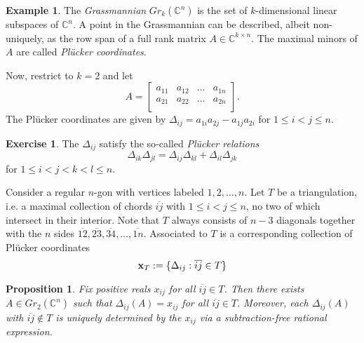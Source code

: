 \documentclass{amsart}
\newtheorem{proposition}[theorem]{Proposition}
\theoremstyle{definition}
\newtheorem{example}[theorem]{Example}
\newtheorem{subexercise}{Exercise}[theorem]
\theoremstyle{remark}
\numberwithin{equation}{section}
\newcommand{\x}{{\bf x}}
\newcommand{\CC}{{\mathbb{C}}}
\begin{document}
  \begin{example} \label{example:Gr2n}
		The \emph{Grassmannian} $Gr_{k}(\CC^n)$ is the set of $k$-dimensional linear subspaces of $\CC^n$.  A point in the Grassmannian can be described, albeit non-uniquely, as the row span of a full rank matrix $A \in \CC^{k \times n}$.  The maximal minors of $A$ are called \emph{Pl\"ucker coordinates}.
		
		Now, restrict to $k=2$ and let 
		\begin{displaymath}
			A = \left[ \begin{array}{cccc}
			a_{11} & a_{12} & \ldots & a_{1n} \\
			a_{21} & a_{22} & \ldots & a_{2n} \\
			\end{array} \right].
		\end{displaymath}
		The Pl\"ucker coordinates are given by $\Delta_{ij} = a_{1i}a_{2j} - a_{1j}a_{2i}$ for $1 \leq i < j \leq n$.  
		
		\begin{subexercise}
			The $\Delta_{ij}$ satisfy the so-called \emph{Pl\"ucker relations}
			\begin{displaymath}
				\Delta_{ik}\Delta_{jl} = \Delta_{ij}\Delta_{kl} + \Delta_{il}\Delta_{jk}
			\end{displaymath}
			for $1 \leq i < j < k < l \leq n$.
		\end{subexercise}
		
		Consider a regular $n$-gon with vertices labeled $1,2,\ldots, n$.  Let $T$ be a triangulation, i.e. a maximal collection of chords $\overline{ij}$ with $1 \leq i < j \leq n$, no two of which intersect in their interior.  Note that $T$ always consists of $n-3$ diagonals together with the $n$ sides $\overline{12}, \overline{23}, \overline{34}, \ldots, \overline{1n}$.  Associated to $T$ is a corresponding collection of Pl\"ucker coordinates
		\begin{displaymath}
			\x_T := \{\Delta_{ij} : \overline{ij} \in T\}
		\end{displaymath}
		\begin{proposition}
		Fix positive reals $x_{ij}$ for all $\overline{ij} \in T$.  Then there exists $A \in Gr_2(\CC^n)$ such that $\Delta_{ij}(A) = x_{ij}$ for all $\overline{ij} \in T$.  Moreover, each $\Delta_{ij}(A)$ with $\overline{ij} \notin T$ is uniquely determined by the $x_{ij}$ via a subtraction-free rational expression.
		\end{proposition}
		

\end{example}
\end{document}
